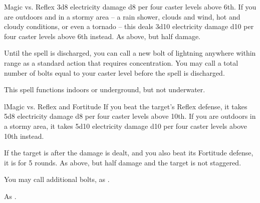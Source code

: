 \begin{spellheader}
\end{spellheader}
\begin{spelleffects}
    \begin{spellattack}{Magic vs. Reflex}
        \spellsuccess 3d8 electricity damage \add d8 per four caster levels above 6th. If you are outdoors and in a stormy area -- a rain shower, clouds and wind, hot and cloudy conditions, or even a tornado -- this deals 3d10 electricity damage \add d10 per four caster levels above 6th instead.
        \spellfailure As above, but half damage.
    \end{spellattack}
    \spelleffect Until the spell is discharged, you can call a new bolt of lightning anywhere within range as a standard action that requires concentration. You may call a total number of bolts equal to your caster level before the spell is discharged.
\end{spelleffects}
\begin{spellfooter}
    \spellnotes This spell functions indoors or underground, but not underwater. \destructivespellnotes
\end{spellfooter}

\begin{spellheader}
\end{spellheader}
\begin{spelleffects}
    \begin{spellattack}l{Magic vs. Reflex and Fortitude}
        \spellsuccess If you beat the target's Reflex defense, it takes 5d8 electricity damage \add d8 per four caster levels above 10th. If you are outdoors in a stormy area, it takes 5d10 electricity damage \add d10 per four caster levels above 10th instead.

        If the target is \bloodied after the damage is dealt, and you also beat its Fortitude defense, it is \staggered for 5 rounds.
        \spellfailure As above, but half damage and the target is not staggered.
    \end{spellattack}
    \spelleffect You may call additional bolts, as .
\end{spelleffects}
\begin{spellfooter}
    \spellnotes As .
\end{spellfooter}

